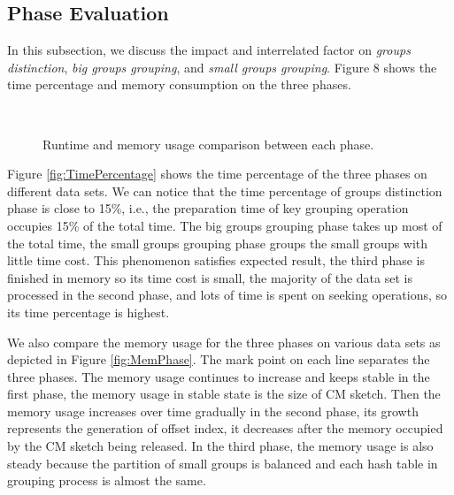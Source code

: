 \subsection{Phase Evaluation}
In this subsection, we discuss the impact and interrelated factor on \emph{groups distinction}, \emph{big groups grouping}, and \emph{small groups grouping}. Figure 8 shows the time percentage and memory consumption on the three phases. 

\begin{figure}[htbp]	
	\label{fig: PhaseEvaluation}
    \hspace{0.23cm}
    \\    
	\caption{Runtime and memory usage comparison between each phase.}
		
\end{figure}

Figure \ref{fig:TimePercentage} shows the time percentage of the three phases on different data sets. We can notice that the time percentage of groups distinction phase is close to 15\%, i.e., the preparation time of key grouping operation occupies 15\% of the total time. The big groups grouping phase takes up most of the total time, the small groups grouping phase groups the small groups with little time cost. This phenomenon satisfies expected result, the third phase is finished in memory so its time cost is small, the majority of the data set is processed in the second phase, and lots of time is spent on seeking operations, so its time percentage is highest.

We also compare the memory usage for the three phases on various data sets as depicted in Figure \ref{fig:MemPhase}. The mark point on each line separates the three phases. The memory usage continues to increase and keeps stable in the first phase, the memory usage in stable state is the size of CM sketch. Then the memory usage increases over time gradually in the second phase, its growth represents the generation of offset index, it decreases after the memory occupied by the CM sketch being released. In the third phase, the memory usage is also steady because the partition of small groups is balanced and each hash table in grouping process is almost the same.



